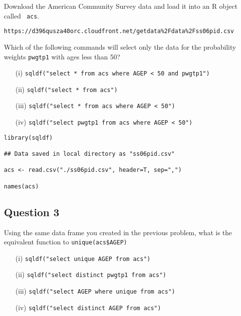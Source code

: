 \documentclass[12pt]{article}
\begin{document}
\bigskip
\noindent Download the American Community Survey data and load it into an R object called
\texttt{ acs}.

\begin{verbatim}
https://d396qusza40orc.cloudfront.net/getdata%2Fdata%2Fss06pid.csv 
\end{verbatim}

\noindent Which of the following commands will select only the data for the probability weights \texttt{pwgtp1} with ages less than 50?
\begin{itemize}
\item[(i)] \texttt{sqldf("select * from acs where AGEP < 50 and pwgtp1")}
\item[(ii)] \texttt{sqldf("select * from acs")}
\item[(iii)] \texttt{sqldf("select * from acs where AGEP < 50")}
\item[(iv)] \texttt{sqldf("select pwgtp1 from acs where AGEP < 50")}
\end{itemize}

\begin{framed}
\begin{verbatim}
library(sqldf)

## Data saved in local directory as "ss06pid.csv"

acs <- read.csv("./ss06pid.csv", header=T, sep=",")

names(acs)
\end{verbatim}
\end{framed}
\newpage
\subsection*{Question 3}
Using the same data frame you created in the previous problem, what is the equivalent function to \texttt{unique(acs\$AGEP)}
\begin{itemize}
\item[(i)] \texttt{sqldf("select unique AGEP from acs")}
\item[(ii)] \texttt{sqldf("select distinct pwgtp1 from acs")}
\item[(iii)] \texttt{sqldf("select AGEP where unique from acs")}
\item[(iv)] \texttt{sqldf("select distinct AGEP from acs")}
\end{itemize}

\newpage
\end{document}
